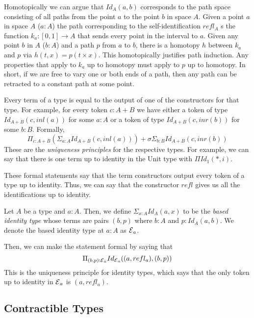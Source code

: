 \documentclass{article}
\begin{document}
Homotopically we can argue that $Id_{A}(a, b)$ corresponds to the path space consisting of all paths from the point $a$ to the point $b$ in space $A$. Given a point $a$ in space $A$ ($a : A$) the path corresponding to the self-identification $refl_{A}$ s the function $k_{a} : [0, 1] \to A$ that sends every point in the interval to $a$. Given any point $b$ in $A$ ($b : A$) and a path $p$ from $a$ to $b$, there is a homotopy $h$ between $k_{a}$ and $p$ via $h(t, x) = p(t \times x)$. This homotopically justifies path induction. Any properties that apply to $k_{a}$ up to homotopy must apply to $p$ up to homotopy. In short, if we are free to vary one or both ends of a path, then any path can be retracted to a constant path at some point.

Every term of a type is equal to the output of one of the constructors for that type. For example, for every token $c : A + B$ we have either a token of type $Id_{A+B}(c, inl(a))$ for some $a : A$ or a token of type $Id_{A+B}(c, inr(b))$ for some $b : B$. Formally,
\begin{equation*}
\Pi_{c : A + B}(\Sigma_{a : A}Id_{A + B}(c, inl(a))) + \sigma \Sigma_{b : B}Id_{A + B}(c, inr(b))
\end{equation*}
These are the \emph{uniqueness principles} for the respective types. For example, we can say that there is one term up to identity in the Unit type with $\Pi Id_{1}(*, i)$.

These formal statements say that the term constructors output every token of a type up to identity. Thus, we can say that the constructor $refl$ gives us all the identifications up to identity.
\begin{definition}
  Let $A$ be a type and $a : A$. Then, we define $\Sigma_{x : A} Id_{A}(a, x)$ to be the \emph{based identity type} whose terms are pairs $(b, p)$ where $b : A$ and $p : Id_{A}(a, b)$. We denote the based identity type at $a : A$ as $\operatorname{\mathcal{E}}_{a}$.
\end{definition}
Then, we can make the statement formal by saying that
\begin{equation*}
  \Pi_{(b, p) : \operatorname{\mathcal{E}}_{a}} Id_{\operatorname{\mathcal{E}}_{a}}((a, refl_{a}), (b, p))
\end{equation*}
This is the uniqueness principle for identity types, which says that the only token up to identity in $\operatorname{\mathcal{E}}_{a}$ is $(a, refl_{a})$.


\subsection{Contractible Types}
\end{document}
